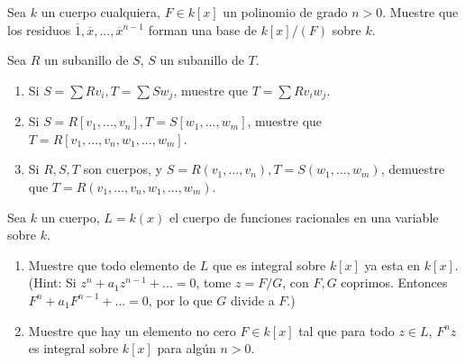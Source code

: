 \begin{sol}{1.33}

\end{sol}

\begin{prob}{1.37}
    Sea \(k\) un cuerpo cualquiera, \(F\in k[x]\) un polinomio de grado \(n>0\). Muestre que los residuos \(\overline{1},\overline{x},...,\overline{x}^{n-1}\) forman una base de \(k[x]/(F)\) sobre \(k\).
\end{prob}

\begin{sol}{1.37}

\end{sol}

\begin{prob}{1.45}
    Sea \(R\) un subanillo de \(S\), \(S\) un subanillo de \(T\).
    \begin{enumerate}
        \item Si \(S=\sum Rv_i,T=\sum Sw_j\), muestre que \(T=\sum Rv_iw_j\).
        \item Si \(S=R[v_1,...,v_n],T=S[w_1,...,w_m]\), muestre que \(T=R[v_1,...,v_n,w_1,...,w_m]\).
        \item Si \(R,S,T\) son cuerpos, y \(S=R(v_1,...,v_n),T=S(w_1,...,w_m)\), demuestre que \(T=R(v_1,...,v_n,w_1,...,w_m)\).
    \end{enumerate}
\end{prob}

\begin{sol}{1.45}

\end{sol}

\begin{prob}{1.49}
    Sea \(k\) un cuerpo, \(L=k(x)\) el cuerpo de funciones racionales en una variable sobre \(k\).
    \begin{enumerate}
        \item Muestre que todo elemento de \(L\) que es integral sobre \(k[x]\) ya esta en \(k[x]\). (Hint: Si \(z^n+a_1z^{n-1}+...=0\), tome \(z=F/G\), con \(F,G\) coprimos. Entonces \(F^n+a_1F^{n-1}+...=0\), por lo que \(G\) divide a \(F\).)
        \item Muestre que hay un elemento no cero \(F\in k[x]\) tal que para todo \(z\in L\), \(F^nz\) es integral sobre \(k[x]\) para algún \(n>0\).
    \end{enumerate}
\end{prob}

\begin{sol}{1.49}

\end{sol}

